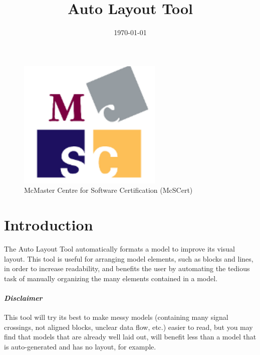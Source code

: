 \documentclass{article}
\makeatletter
\newcommand{\ToolName}{Auto Layout Tool\@\xspace}
\makeatother
\begin{document}
\title{\ToolName}
\date{\monthyeardate\today}
\maketitle
\vfill

\begin{figure}
	\centering
	\includegraphics[]{../figs/McSCert_Logo.pdf} \\
	McMaster Centre for Software Certification (McSCert)
\end{figure}

\newpage

\tableofcontents
\newpage

\section{Introduction}

The \ToolName automatically formats a \Simulink model to improve its visual layout. This tool is useful for arranging \Simulink model elements, such as blocks and lines, in order to increase readability, and benefits the user by automating the tedious task of manually organizing the many elements contained in a model.

\paragraph*{\textit{Disclaimer}} This tool will try its best to make messy models (containing many signal crossings, not aligned blocks, unclear data flow, etc.) easier to read, but you may find that models that are already well laid out, will benefit less than a model that is auto-generated and has no layout, for example.
\end{document}
